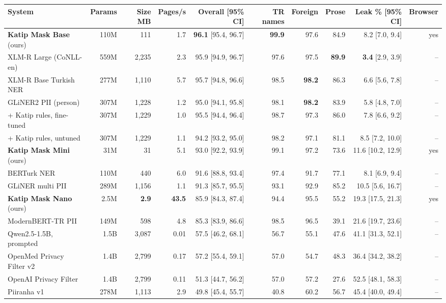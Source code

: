 \documentclass[10pt,twocolumn]{article}
\begin{document}
\begin{table}[t]
\centering\footnotesize
\setlength{\tabcolsep}{2.6pt}
\begin{tabular}{@{}lrrrrrrrrr@{}}
\toprule
System & Params & Size MB & Pages/s & \textbf{Overall} [95\% CI] & TR names & Foreign & Prose & Leak \% [95\% CI] & Browser \\
\midrule
\textbf{Katip Mask Base} (ours) & 110M & 111 & 1.7 & \textbf{96.1} [95.4, 96.7] & \textbf{99.9} & 97.6 & 84.9 & 8.2 [7.0, 9.4] & yes \\
XLM-R Large (CoNLL-en) & 559M & 2,235 & 2.3 & 95.9 [94.9, 96.7] & 97.6 & 97.5 & \textbf{89.9} & \textbf{3.4} [2.9, 3.9] & -- \\
XLM-R Base Turkish NER & 277M & 1,110 & 5.7 & 95.7 [94.8, 96.6] & 98.5 & \textbf{98.2} & 86.3 & 6.6 [5.6, 7.8] & -- \\
GLiNER2 PII (person) & 307M & 1,228 & 1.2 & 95.0 [94.1, 95.8] & 98.1 & \textbf{98.2} & 83.9 & 5.8 [4.8, 7.0] & -- \\
\quad + Katip rules, fine-tuned & 307M & 1,229 & 1.0 & 95.5 [94.4, 96.4] & 98.7 & 97.3 & 86.0 & 7.8 [6.6, 9.2] & -- \\
\quad + Katip rules, untuned & 307M & 1,229 & 1.1 & 94.2 [93.2, 95.0] & 98.2 & 97.1 & 81.1 & 8.5 [7.2, 10.0] & -- \\
\textbf{Katip Mask Mini} (ours) & 31M & 31 & 5.1 & 93.0 [92.2, 93.9] & 99.1 & 97.2 & 73.6 & 11.6 [10.2, 12.9] & yes \\
BERTurk NER & 110M & 440 & 6.0 & 91.6 [88.8, 93.4] & 97.4 & 91.7 & 77.1 & 8.1 [6.9, 9.4] & -- \\
GLiNER multi PII & 289M & 1,156 & 1.1 & 91.3 [85.7, 95.5] & 93.1 & 92.9 & 85.2 & 10.5 [5.6, 16.7] & -- \\
\textbf{Katip Mask Nano} (ours) & 2.5M & \textbf{2.9} & \textbf{43.5} & 85.9 [84.3, 87.4] & 94.4 & 95.5 & 55.2 & 19.3 [17.5, 21.3] & yes \\
ModernBERT-TR PII & 149M & 598 & 4.8 & 85.3 [83.9, 86.6] & 98.5 & 96.5 & 39.1 & 21.6 [19.7, 23.6] & -- \\
Qwen2.5-1.5B, prompted & 1.5B & 3,087 & 0.01 & 57.5 [46.2, 68.1] & 56.7 & 55.1 & 47.6 & 41.1 [31.3, 52.1] & -- \\
OpenMed Privacy Filter v2 & 1.4B & 2,799 & 0.17 & 57.2 [55.4, 59.1] & 57.0 & 54.7 & 48.3 & 36.4 [34.2, 38.2] & -- \\
OpenAI Privacy Filter & 1.4B & 2,799 & 0.11 & 51.3 [44.7, 56.2] & 57.0 & 57.2 & 27.6 & 52.5 [48.1, 58.3] & -- \\
Piiranha v1 & 278M & 1,113 & 2.9 & 49.8 [45.4, 55.7] & 40.8 & 60.2 & 56.7 & 45.4 [40.0, 49.4] & -- \\

\end{tabular}
\end{table}
\end{document}
